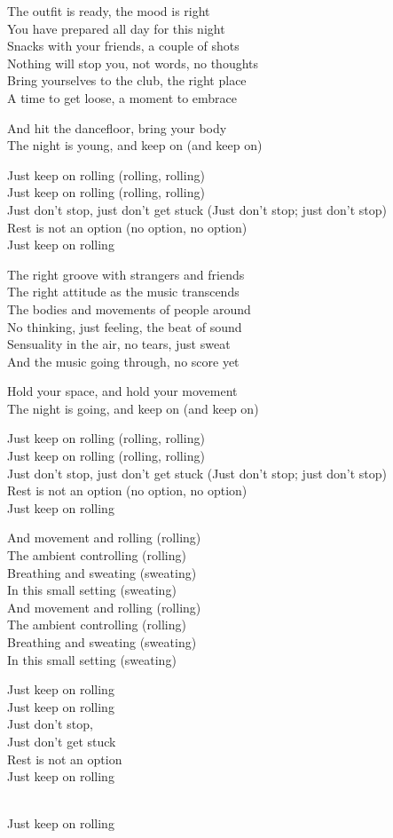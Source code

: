 \begin{lyrics}
The outfit is ready, the mood is right\\
You have prepared all day for this night\\
Snacks with your friends, a couple of shots\\
Nothing will stop you, not words, no thoughts\\
Bring yourselves to the club, the right place\\
A time to get loose, a moment to embrace

And hit the dancefloor, bring your body\\
The night is young, and keep on (and keep on)

Just keep on rolling (rolling, rolling)\\
Just keep on rolling (rolling, rolling)\\
Just don't stop, just don't get stuck
(Just don't stop; just don't stop)\\
Rest is not an option (no option, no option)\\
Just keep on rolling

The right groove with strangers and friends\\
The right attitude as the music transcends\\
The bodies and movements of people around\\
No thinking, just feeling, the beat of sound\\
Sensuality in the air, no tears, just sweat\\
And the music going through, no score yet

Hold your space, and hold your movement\\
The night is going, and keep on (and keep on)

Just keep on rolling (rolling, rolling)\\
Just keep on rolling (rolling, rolling)\\
Just don't stop, just don't get stuck
(Just don't stop; just don't stop)\\
Rest is not an option (no option, no option)\\
Just keep on rolling

And movement and rolling (rolling)\\
The ambient controlling (rolling)\\
Breathing and sweating (sweating)\\
In this small setting (sweating)\\
And movement and rolling (rolling)\\
The ambient controlling (rolling)\\
Breathing and sweating (sweating)\\
In this small setting (sweating)

Just keep on rolling\\
Just keep on rolling\\
Just don't stop,\\
Just don't get stuck\\
Rest is not an option\\
Just keep on rolling

\\
Just keep on rolling
\end{lyrics}

